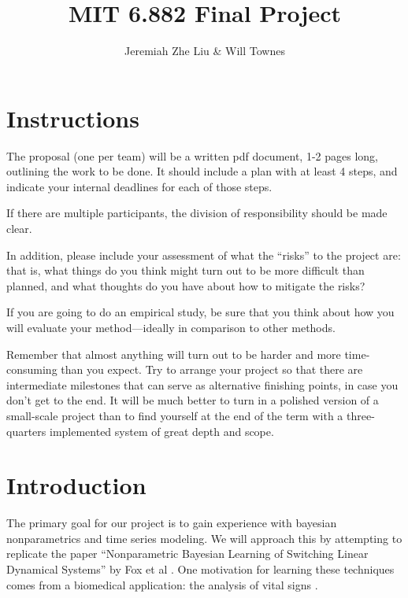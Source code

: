 \documentclass[12pt]{article}
\begin{document}
\title{MIT 6.882 Final Project}
\author{Jeremiah Zhe Liu \& Will Townes}
\maketitle

\section{Instructions} %
The proposal (one per team) will be a written pdf document, 1-2 pages long, outlining the work to be done. It should include a plan with at least 4 steps, and indicate your internal deadlines for each of those steps.

If there are multiple participants, the division of responsibility should be made clear.

In addition, please include your assessment of what the “risks” to the project are: that is, what things do you think might turn out to be more difficult than planned, and what thoughts do you have about how to mitigate the risks?

If you are going to do an empirical study, be sure that you think about how you will evaluate your method—ideally in comparison to other methods.

Remember that almost anything will turn out to be harder and more time-consuming than you expect. Try to arrange your project so that there are intermediate milestones that can serve as alternative finishing points, in case you don’t get to the end. It will be much better to turn in a polished version of a small-scale project than to find yourself at the end of the term with a three-quarters implemented system of great depth and scope.

\section{Introduction}
The primary goal for our project is to gain experience with bayesian nonparametrics and time series modeling. We will approach this by attempting to replicate the paper ``Nonparametric Bayesian Learning of Switching Linear Dynamical Systems'' by Fox et al \cite{fox_nonparametric_2009}. One motivation for learning these techniques comes from a biomedical application: the analysis of vital signs \cite{lehman_bayesian_2015}\cite{lehman_physiological_2015}.
\end{document}
